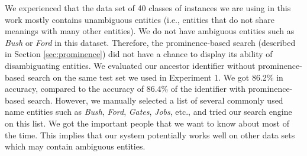 





We experienced that the data set of 40 classes of instances we are using in this work mostly contains unambiguous entities (i.e., entities that do not share meanings with many other entities). We do not have ambiguous entities such as {\em Bush} or {\em Ford} in this dataset. Therefore, the prominence-based search (described in Section \ref{sec:prominence}) did not have a chance to display its ability of disambiguating entities. We evaluated our ancestor identifier without prominence-based search on the same test set we used in Experiment 1. We got 86.2\% in accuracy, compared to the accuracy of 86.4\% of the identifier with prominence-based search. However, we manually selected a list of several commonly used name entities such as {\em Bush}, {\em Ford}, {\em Gates}, {\em Jobs}, etc., and tried our search engine on this list. We got the important people that we want to know about most of the time. This implies that our system potentially works well on other data sets which may contain ambiguous entities.
